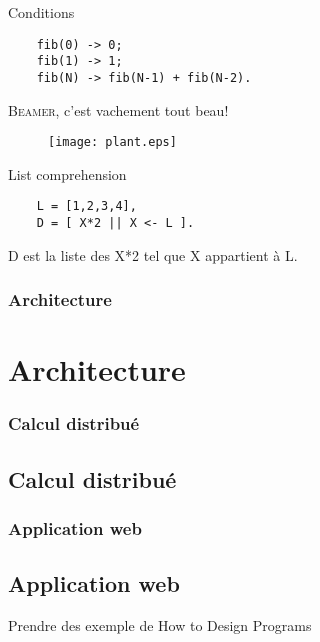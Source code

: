 \documentclass[notes=only]{beamer}
\begin{document}
\begin{frame}[fragile]
  Conditions
  \begin{verbatim}
    fib(0) -> 0;
    fib(1) -> 1;
    fib(N) -> fib(N-1) + fib(N-2).
  \end{verbatim}
\end{frame}

\begin{frame}
  \textsc{Beamer}, c'est vachement tout beau!
  \begin{figure}
    \texttt{[image: plant.eps]}
  \end{figure}
\end{frame}

\begin{frame}[fragile]
  List comprehension

  \begin{verbatim}
    L = [1,2,3,4],
    D = [ X*2 || X <- L ].
  \end{verbatim}

  D est la liste des X*2 tel que X appartient à L.
\end{frame}

\begin{frame}
  \frametitle{Architecture}
  \section[Architecture]{Architecture}
\end{frame}

\begin{frame}
  \frametitle{Calcul distribué}
  \subsection[Calcul distribué]{Calcul distribué}


\end{frame}

\begin{frame}
  \frametitle{Application web}
  \subsection[Application web]{Application web}


\end{frame}


\begin{frame}
  Prendre des exemple de How to Design Programs
\end{frame}
\end{document}
